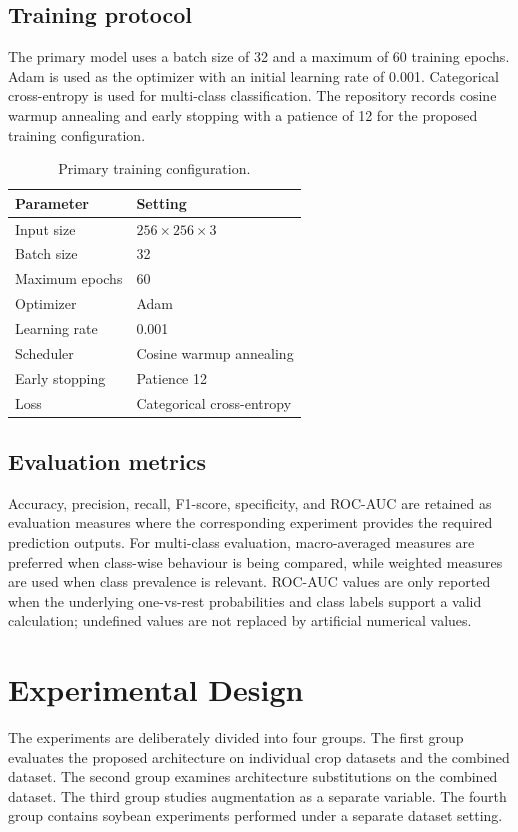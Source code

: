 \documentclass[a4paper,fleqn]{cas-dc}
\begin{document}
\subsection{Training protocol}
The primary model uses a batch size of 32 and a maximum of 60 training epochs. Adam is used as the optimizer with an initial learning rate of 0.001. Categorical cross-entropy is used for multi-class classification. The repository records cosine warmup annealing and early stopping with a patience of 12 for the proposed training configuration.

\begin{table}[t]
\centering
\caption{Primary training configuration.}
\label{tab:training}
\begin{tabular}{p{3.1cm}p{3.0cm}}
\toprule
Parameter & Setting\\
\midrule
Input size & $256\times256\times3$\\
Batch size & 32\\
Maximum epochs & 60\\
Optimizer & Adam\\
Learning rate & 0.001\\
Scheduler & Cosine warmup annealing\\
Early stopping & Patience 12\\
Loss & Categorical cross-entropy\\
\bottomrule
\end{tabular}
\end{table}

\subsection{Evaluation metrics}
Accuracy, precision, recall, F1-score, specificity, and ROC-AUC are retained as evaluation measures where the corresponding experiment provides the required prediction outputs. For multi-class evaluation, macro-averaged measures are preferred when class-wise behaviour is being compared, while weighted measures are used when class prevalence is relevant. ROC-AUC values are only reported when the underlying one-vs-rest probabilities and class labels support a valid calculation; undefined values are not replaced by artificial numerical values.

\section{Experimental Design}
The experiments are deliberately divided into four groups. The first group evaluates the proposed architecture on individual crop datasets and the combined dataset. The second group examines architecture substitutions on the combined dataset. The third group studies augmentation as a separate variable. The fourth group contains soybean experiments performed under a separate dataset setting.
\end{document}
